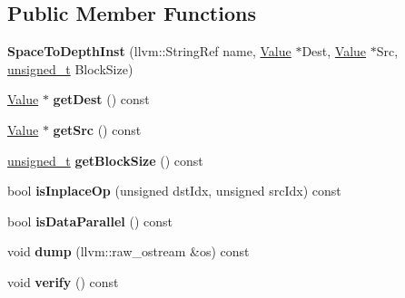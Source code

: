 \subsection*{Public Member Functions}
\begin{DoxyCompactItemize}
\item 
\mbox{\label{classglow_1_1_space_to_depth_inst_abc54b6da173b64bc0f4917203d2f4ff4}} 
{\bfseries Space\+To\+Depth\+Inst} (llvm\+::\+String\+Ref name, \hyperlink{classglow_1_1_value}{Value} $\ast$Dest, \hyperlink{classglow_1_1_value}{Value} $\ast$Src, \hyperlink{namespaceglow_a0ca574644e1e42ef193a9947fb4d8911}{unsigned\+\_\+t} Block\+Size)
\item 
\mbox{\label{classglow_1_1_space_to_depth_inst_a266e5a2b64338a60dcb6c08c49aeb4e4}} 
\hyperlink{classglow_1_1_value}{Value} $\ast$ {\bfseries get\+Dest} () const
\item 
\mbox{\label{classglow_1_1_space_to_depth_inst_ac45af46055ab2f4852c65665f6ac1f52}} 
\hyperlink{classglow_1_1_value}{Value} $\ast$ {\bfseries get\+Src} () const
\item 
\mbox{\label{classglow_1_1_space_to_depth_inst_a47a0972dc5f5fd152405a2ea74ba7c6b}} 
\hyperlink{namespaceglow_a0ca574644e1e42ef193a9947fb4d8911}{unsigned\+\_\+t} {\bfseries get\+Block\+Size} () const
\item 
\mbox{\label{classglow_1_1_space_to_depth_inst_ac2d36142f6ef06032b4745b07afb38a4}} 
bool {\bfseries is\+Inplace\+Op} (unsigned dst\+Idx, unsigned src\+Idx) const
\item 
\mbox{\label{classglow_1_1_space_to_depth_inst_a007906f5fe103939f00ae762346da852}} 
bool {\bfseries is\+Data\+Parallel} () const
\item 
\mbox{\label{classglow_1_1_space_to_depth_inst_aca5db712edb1bc85adb43141d63a081c}} 
void {\bfseries dump} (llvm\+::raw\+\_\+ostream \&os) const
\item 
\mbox{\label{classglow_1_1_space_to_depth_inst_a911add9faa79bb2d57795d5a699e845e}} 
void {\bfseries verify} () const
\end{DoxyCompactItemize}
